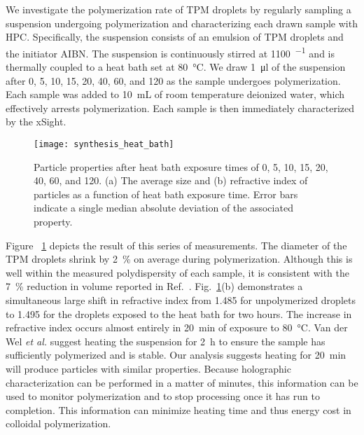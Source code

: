 We investigate the polymerization rate of TPM droplets by regularly sampling a
suspension undergoing polymerization and characterizing each drawn sample with HPC.
Specifically, the suspension consists of an emulsion of TPM droplets
and the initiator AIBN. The suspension is continuously stirred at \SI{1100}{\min^{-1}}
and is thermally coupled to a heat bath set at \SI{80}{\degreeCelsius}.
We draw \SI{1}{\ul} of the suspension after \num{0}, \num{5}, \num{10}, \num{15},
\num{20}, \num{40}, \SI{60}{\min}, and \SI{120}{\min} as the sample undergoes polymerization.
Each sample was added to \SI{10}{\milli\liter} of room temperature deionized water,
which effectively arrests polymerization. 
Each sample is then immediately characterized by the xSight.

\begin{figure}
    \centering
    \texttt{[image: synthesis\_heat\_bath]}
    \caption{Particle properties after heat bath exposure times of \num{0}, \num{5},
      \num{10}, \num{15}, \num{20}, \num{40}, \SI{60}{\min}, and \SI{120}{\min}.
      (a) The average size and (b) refractive index of particles as a function
      of heat bath exposure time. Error bars indicate a single median absolute deviation
      of the associated property.}
    \label{fig:heat_size_time}
\end{figure}

Figure ~\ref{fig:heat_size_time} depicts the result of this series of
measurements. The diameter of the TPM droplets shrink by \SI{2}{\percent} on average
during polymerization.
Although this is well within the
measured polydispersity of each sample, it is consistent with the \SI{7}{\percent} reduction
in volume reported in Ref.~\cite{vanderwel17}. %
Fig.~\ref{fig:heat_size_time}(b) demonstrates a simultaneous large shift in refractive index
from \SI{1.485}{} for unpolymerized droplets to \SI{1.495}{} for the droplets
exposed to the heat bath for two hours. The increase in refractive index occurs almost
entirely in \SI{20}{\minute} of exposure to \SI{80}{\degreeCelsius}.
Van der Wel \emph{et al.} \cite{vanderwel17} suggest heating the suspension
for \SI{2}{\hour} to ensure the sample has sufficiently polymerized and is
stable. Our analysis suggests heating for \SI{20}{\minute} will produce
particles with similar properties. %
Because holographic characterization can be performed in a matter of minutes,
this information can be used to monitor polymerization and to stop processing
once it has run to completion. This information can minimize heating time
and thus energy cost in colloidal polymerization.


